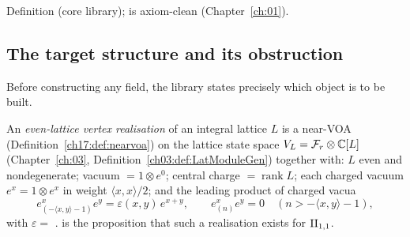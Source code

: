 \begin{status}
Definition (core library);  is axiom-clean (Chapter~\ref{ch:01}).
\end{status}

\subsection{The target structure and its obstruction}

Before constructing any field, the library states precisely which object is to be built.

\begin{definition}\label{ch17:def:target}
An \emph{even-lattice vertex realisation} of an integral lattice $L$ is a near-VOA
(Definition~\ref{ch17:def:nearvoa}) on the lattice state
space $V_L=\mathcal{F}_r\otimes{\mathbb{C}}[L]$ (Chapter~\ref{ch:03}, Definition~\ref{ch03:def:LatModuleGen})
together with: $L$ even and nondegenerate; vacuum $=1\otimes e^0$; central charge $=\operatorname{rank}L$;
each charged vacuum $e^x=1\otimes e^x$ in weight $\langle x,x\rangle/2$; and the leading product of charged
vacua
\begin{equation}\label{ch17:eq:chargeleading}
  e^x_{(-\langle x,y\rangle-1)}e^y=\varepsilon(x,y)\,e^{x+y},\qquad e^x_{(n)}e^y=0\quad(n>-\langle x,y\rangle-1),
\end{equation}
with $\varepsilon=$ .   is the proposition that such a
realisation exists for ${\mathrm{II}_{1,1}}$.
\end{definition}

